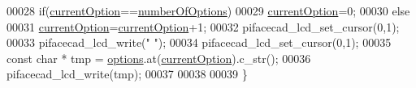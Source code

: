 \begin{DoxyCode}
00028     \textcolor{keywordflow}{if}(\hyperlink{classAbstractMenu_a589fea1bf68c33e0eff64c8b609cb980}{currentOption}==\hyperlink{classAbstractMenu_a6caff7f6281c6c2912e5f808c2906123}{numberOfOptions})
00029         \hyperlink{classAbstractMenu_a589fea1bf68c33e0eff64c8b609cb980}{currentOption}=0;
00030     \textcolor{keywordflow}{else}
00031         \hyperlink{classAbstractMenu_a589fea1bf68c33e0eff64c8b609cb980}{currentOption}=\hyperlink{classAbstractMenu_a589fea1bf68c33e0eff64c8b609cb980}{currentOption}+1;
00032     pifacecad\_lcd\_set\_cursor(0,1);
00033     pifacecad\_lcd\_write(\textcolor{stringliteral}{"                   "});
00034     pifacecad\_lcd\_set\_cursor(0,1);
00035     \textcolor{keyword}{const} \textcolor{keywordtype}{char} * tmp = \hyperlink{classAbstractMenu_a990dc4299fbe86152487fd35d46a403b}{options}.at(\hyperlink{classAbstractMenu_a589fea1bf68c33e0eff64c8b609cb980}{currentOption}).c\_str();
00036     pifacecad\_lcd\_write(tmp);
00037 
00038 
00039 \}
\end{DoxyCode}
